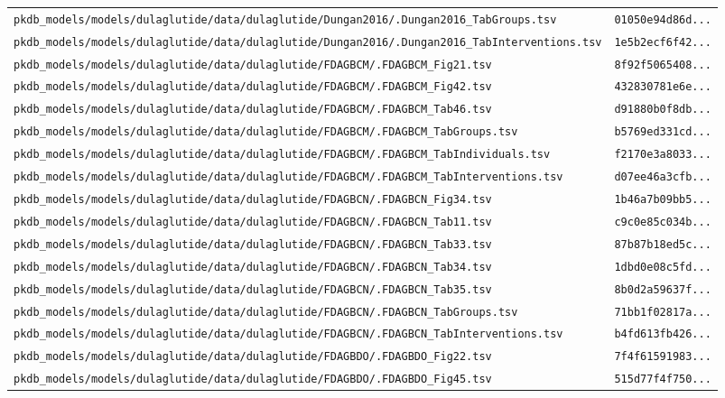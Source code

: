 \documentclass{article}
\begin{document}
\begin{longtable}{ll}
\texttt{pkdb\_models/models/dulaglutide/data/dulaglutide/Dungan2016/.Dungan2016\_TabGroups.tsv} & \texttt{01050e94d86d...} \\
\texttt{pkdb\_models/models/dulaglutide/data/dulaglutide/Dungan2016/.Dungan2016\_TabInterventions.tsv} & \texttt{1e5b2ecf6f42...} \\
\texttt{pkdb\_models/models/dulaglutide/data/dulaglutide/FDAGBCM/.FDAGBCM\_Fig21.tsv} & \texttt{8f92f5065408...} \\
\texttt{pkdb\_models/models/dulaglutide/data/dulaglutide/FDAGBCM/.FDAGBCM\_Fig42.tsv} & \texttt{432830781e6e...} \\
\texttt{pkdb\_models/models/dulaglutide/data/dulaglutide/FDAGBCM/.FDAGBCM\_Tab46.tsv} & \texttt{d91880b0f8db...} \\
\texttt{pkdb\_models/models/dulaglutide/data/dulaglutide/FDAGBCM/.FDAGBCM\_TabGroups.tsv} & \texttt{b5769ed331cd...} \\
\texttt{pkdb\_models/models/dulaglutide/data/dulaglutide/FDAGBCM/.FDAGBCM\_TabIndividuals.tsv} & \texttt{f2170e3a8033...} \\
\texttt{pkdb\_models/models/dulaglutide/data/dulaglutide/FDAGBCM/.FDAGBCM\_TabInterventions.tsv} & \texttt{d07ee46a3cfb...} \\
\texttt{pkdb\_models/models/dulaglutide/data/dulaglutide/FDAGBCN/.FDAGBCN\_Fig34.tsv} & \texttt{1b46a7b09bb5...} \\
\texttt{pkdb\_models/models/dulaglutide/data/dulaglutide/FDAGBCN/.FDAGBCN\_Tab11.tsv} & \texttt{c9c0e85c034b...} \\
\texttt{pkdb\_models/models/dulaglutide/data/dulaglutide/FDAGBCN/.FDAGBCN\_Tab33.tsv} & \texttt{87b87b18ed5c...} \\
\texttt{pkdb\_models/models/dulaglutide/data/dulaglutide/FDAGBCN/.FDAGBCN\_Tab34.tsv} & \texttt{1dbd0e08c5fd...} \\
\texttt{pkdb\_models/models/dulaglutide/data/dulaglutide/FDAGBCN/.FDAGBCN\_Tab35.tsv} & \texttt{8b0d2a59637f...} \\
\texttt{pkdb\_models/models/dulaglutide/data/dulaglutide/FDAGBCN/.FDAGBCN\_TabGroups.tsv} & \texttt{71bb1f02817a...} \\
\texttt{pkdb\_models/models/dulaglutide/data/dulaglutide/FDAGBCN/.FDAGBCN\_TabInterventions.tsv} & \texttt{b4fd613fb426...} \\
\texttt{pkdb\_models/models/dulaglutide/data/dulaglutide/FDAGBDO/.FDAGBDO\_Fig22.tsv} & \texttt{7f4f61591983...} \\
\texttt{pkdb\_models/models/dulaglutide/data/dulaglutide/FDAGBDO/.FDAGBDO\_Fig45.tsv} & \texttt{515d77f4f750...} \\

\end{longtable}
\end{document}
